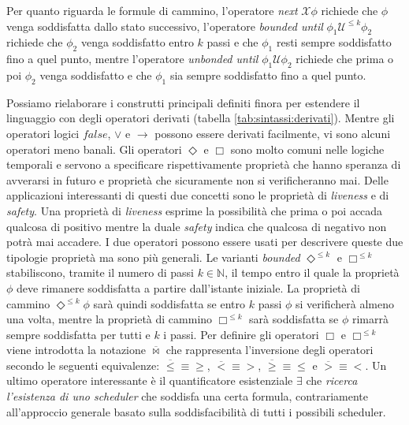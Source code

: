 Per quanto riguarda le formule di cammino, l'operatore \emph{next} $\mathcal{X}\phi$ richiede che $\phi$ venga soddisfatta dallo stato successivo, l'operatore \emph{bounded until} $\phi_1 \mathcal{U}^{\leq k} \phi_2$ richiede che $\phi_2$ venga soddisfatto entro $k$ passi e che $\phi_1$ resti sempre soddisfatto fino a quel punto, mentre l'operatore \emph{unbonded until} $\phi_1 \mathcal{U} \phi_2$ richiede che prima o poi $\phi_2$ venga soddisfatto e che $\phi_1$ sia sempre soddisfatto fino a quel punto.

Possiamo rielaborare i construtti principali definiti finora per estendere il linguaggio con degli operatori derivati (tabella \ref{tab:sintassi:derivati}). Mentre gli operatori logici $false$, $\vee$ e $\rightarrow$ possono essere derivati facilmente, vi sono alcuni operatori meno banali. Gli operatori $\Diamond$ e $\Box$ sono molto comuni nelle logiche temporali e servono a specificare rispettivamente proprietà che hanno speranza di avverarsi in futuro e proprietà che sicuramente non si verificheranno mai. Delle applicazioni interessanti di questi due concetti sono le proprietà di \emph{liveness} e di \emph{safety}. Una proprietà di \emph{liveness} esprime la possibilità che prima o poi accada qualcosa di positivo mentre la duale \emph{safety} indica che qualcosa di negativo non potrà mai accadere. I due operatori possono essere usati per descrivere queste due tipologie proprietà ma sono più generali. 
Le varianti \emph{bounded} $\Diamond^{\leq k}$ e $\Box^{\leq k}$ stabiliscono, tramite il numero di passi $k \in \mathbb{N}$, il tempo entro il quale la proprietà $\phi$ deve rimanere soddisfatta a partire dall'istante iniziale. La proprietà di cammino $\Diamond^{\leq k}\phi$ sarà quindi soddisfatta se entro $k$ passi $\phi$ si verificherà almeno una volta, mentre la proprietà di cammino $\Box^{\leq k}$ sarà soddisfatta se $\phi$ rimarrà sempre soddisfatta per tutti e $k$ i passi. 
Per definire gli operatori $\Box$ e $\Box^{\leq k}$ viene introdotta la notazione $\overline\bowtie$ che rappresenta l'inversione degli operatori secondo le seguenti equivalenze: $\overline\leq \equiv \geq$, $\overline < \equiv >$, $\overline\geq \equiv \leq$ e $\overline > \equiv <$.
Un ultimo operatore interessante è il quantificatore esistenziale $\exists$ che \emph{ricerca l'esistenza di uno scheduler} che soddisfa una certa formula, contrariamente all'approccio generale basato sulla soddisfacibilità di tutti i possibili scheduler.
